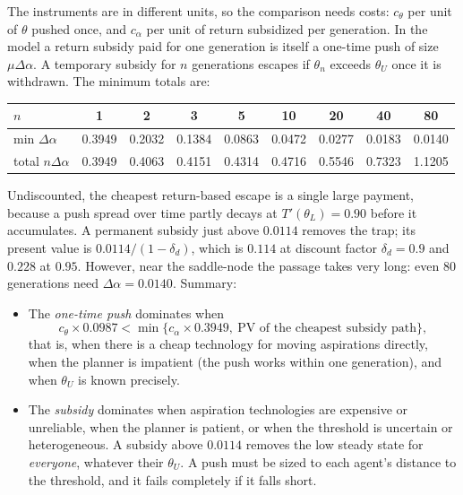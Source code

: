 \documentclass[../solutions_manual.tex]{subfiles}
\begin{document}
 The instruments are in different units, so the comparison needs costs: $c_\theta$ per unit of $\theta$ pushed once, and $c_\alpha$ per unit of return subsidized per generation. In the model a return subsidy paid for one generation is itself a one-time push of size $\mu\Delta\alpha$. A temporary subsidy for $n$ generations escapes if $\theta_n$ exceeds $\theta_U$ once it is withdrawn. The minimum totals are:
\begin{center}
\begin{tabular}{lcccccccc}
\toprule
$n$ & 1 & 2 & 3 & 5 & 10 & 20 & 40 & 80 \\
\midrule
min $\Delta\alpha$ & 0.3949 & 0.2032 & 0.1384 & 0.0863 & 0.0472 & 0.0277 & 0.0183 & 0.0140 \\
total $n\Delta\alpha$ & 0.3949 & 0.4063 & 0.4151 & 0.4314 & 0.4716 & 0.5546 & 0.7323 & 1.1205 \\
\bottomrule
\end{tabular}
\end{center}
Undiscounted, the cheapest return-based escape is a single large payment, because a push spread over time partly decays at $T'(\theta_L) = 0.90$ before it accumulates. A permanent subsidy just above $0.0114$ removes the trap; its present value is $0.0114/(1-\delta_d)$, which is $0.114$ at discount factor $\delta_d = 0.9$ and $0.228$ at $0.95$. However, near the saddle-node the passage takes very long: even 80 generations need $\Delta\alpha = 0.0140$. Summary:
\begin{itemize}
\item The \emph{one-time push} dominates when
\[
c_\theta\times 0.0987 < \min\{c_\alpha\times 0.3949,\ \text{PV of the cheapest subsidy path}\},
\]
that is, when there is a cheap technology for moving aspirations directly, when the planner is impatient (the push works within one generation), and when $\theta_U$ is known precisely.
\item The \emph{subsidy} dominates when aspiration technologies are expensive or unreliable, when the planner is patient, or when the threshold is uncertain or heterogeneous. A subsidy above $0.0114$ removes the low steady state for \emph{everyone}, whatever their $\theta_U$. A push must be sized to each agent's distance to the threshold, and it fails completely if it falls short.
\end{itemize}
\end{document}
